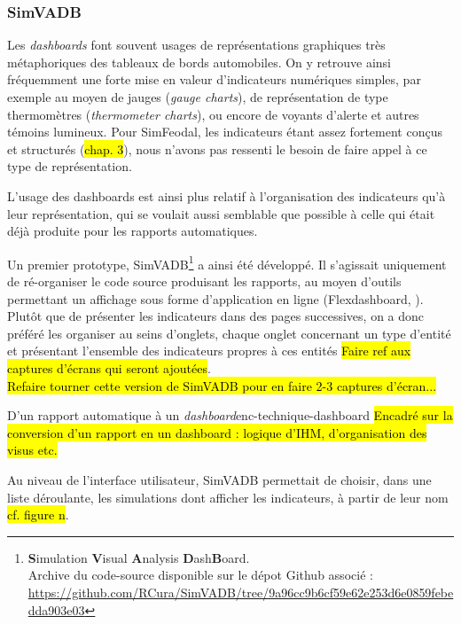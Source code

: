 	\subsubsection{SimVADB}

	Les \textit{dashboards} font souvent usages de représentations graphiques très métaphoriques des tableaux de bords automobiles.
	On y retrouve ainsi fréquemment une forte mise en valeur d'indicateurs numériques simples, par exemple au moyen de jauges (\textit{gauge charts}), de représentation de type thermomètres (\textit{thermometer charts}), ou encore de voyants d'alerte et autres témoins lumineux.
	Pour SimFeodal, les indicateurs étant assez fortement conçus et structurés (\hl{chap. 3}), nous n'avons pas ressenti le besoin de faire appel à ce type de représentation.

	L'usage des dashboards est ainsi plus relatif à l'organisation des indicateurs qu'à leur représentation, qui se voulait aussi semblable que possible à celle qui était déjà produite pour les rapports automatiques.

	Un premier prototype, SimVADB\footnote{
	\textbf{S}imulation \textbf{V}isual \textbf{A}nalysis \textbf{D}ash\textbf{B}oard.\\
	Archive du code-source disponible sur le dépot Github associé :
	\url{https://github.com/RCura/SimVADB/tree/9a96cc9b6cf59e62e253d6e0859febedda903e03}
	} a ainsi été développé.
	Il s'agissait uniquement de ré-organiser le code source produisant les rapports, au moyen d'outils permettant un affichage sous forme d'application en ligne (Flexdashboard, \autocite{iannone_flexdashboard_2018}).
	Plutôt que de présenter les indicateurs dans des pages successives, on a donc préféré les organiser au seins d'onglets, chaque onglet concernant un type d'entité et présentant l'ensemble des indicateurs propres à ces entités \hl{Faire ref aux captures d'écrans qui seront ajoutées}.\\
	\hl{Refaire tourner cette version de SimVADB pour en faire 2-3 captures d'écran...}\\

	\begin{encadre}{D'un rapport automatique à un \textit{dashboard}}{enc-technique-dashboard}
		\hl{Encadré sur la conversion d'un rapport en un dashboard : logique d'IHM, d'organisation des visus etc.}
	\end{encadre}

	Au niveau de l'interface utilisateur, SimVADB permettait de choisir, dans une liste déroulante, les simulations dont afficher les indicateurs, à partir de leur nom \hl{cf. figure n}.

